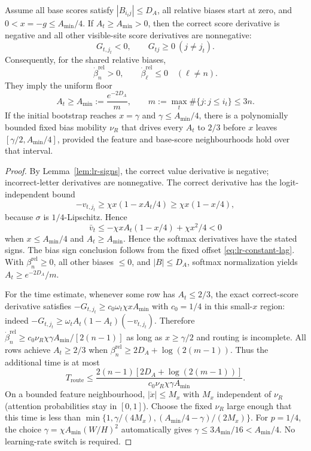 \begin{lrlemma}
\label{lem:lr-bias-learning}
Assume all base scores satisfy $|B_{i_tj}|\le D_A$,
all relative biases start at zero, and
$0<x=-g\le A_{\min}/4$. If $A_t\ge A_{\min}>0$,
then the correct score derivative is negative and all other visible-site
score derivatives are nonnegative:
\begin{equation}\label{eq:lr-smallscore-sign}
 G_{t,j_t}<0,\qquad G_{tj}\ge0\ (j\ne j_t).
\end{equation}
Consequently, for the shared relative biases,
\begin{equation}\label{eq:lr-beta-routes}
 \dot\beta_n^{\mathrm{rel}}>0,\qquad
 \dot\beta_\ell^{\mathrm{rel}}\le0\quad(\ell\ne n).
\end{equation}
They imply the uniform floor
\begin{equation}\label{eq:lr-floor}
 A_t\ge A_{\min}:=\frac{e^{-2D_A}}m,
 \qquad m:=\max_t\#\{j:j\le i_t\}\le3n.
\end{equation}
If the initial bootstrap reaches $x=\gamma$ and
$\gamma\le A_{\min}/4$, there is a polynomially bounded fixed bias
mobility $\nu_R$ that drives every $A_t$ to $2/3$ before $x$ leaves
$[\gamma/2,A_{\min}/4]$, provided the feature and base-score
neighbourhoods hold over that interval.
\end{lrlemma}
\begin{proof}
By Lemma~\ref{lem:lr-signs}, the correct value derivative is negative;
incorrect-letter derivatives are nonnegative.  The correct derivative has the logit-independent bound
\[
 -v_{t,j_t}\ge\chi x(1-xA_t/4)\ge\chi x(1-x/4),
\]
because $\sigma$ is $1/4$-Lipschitz. Hence
\[
 \bar v_t\le-\chi x A_t(1-x/4)+\chi x^2/4<0
\]
when $x\le A_{\min}/4$ and $A_t\ge A_{\min}$.  Hence the softmax derivatives have the stated signs.
The bias sign conclusion follows from the fixed offset
\eqref{eq:lr-constant-lag}.
With $\beta_n^{\mathrm{rel}}\ge0$, all other biases $\le0$,
and $|B|\le D_A$, softmax normalization yields
$A_t\ge e^{-2D_A}/m$.

For the time estimate, whenever some row has $A_t\le2/3$, the exact
correct-score derivative satisfies
$-G_{t,j_t}\ge c_0\omega_t\chi xA_{\min}$
with $c_0=1/4$ in this small-$x$ region: indeed
$-G_{t,j_t}\ge\omega_t A_t(1-A_t)(-v_{t,j_t})$.
Therefore
$\dot\beta_n^{\mathrm{rel}}
\ge c_0\nu_R\chi\gamma A_{\min}/[2(n-1)]$
as long as $x\ge\gamma/2$ and routing is incomplete.
All rows achieve $A_t\ge2/3$ when
$\beta_n^{\mathrm{rel}}\ge
2D_A+\log(2(m-1))$.
Thus the additional time is at most
\[
 T_{\mathrm{route}}
 \le \frac{2(n-1)[2D_A+\log(2(m-1))]}
 {c_0\nu_R\chi\gamma A_{\min}}.
\]
On a bounded feature neighbourhood, $|\dot x|\le M_x$ with $M_x$
independent of $\nu_R$ (attention probabilities stay in $[0,1]$).
Choose the fixed $\nu_R$ large enough that this time is less than
$\min\{1,\gamma/(4M_x),(A_{\min}/4-\gamma)/(2M_x)\}$.
For $p=1/4$, the choice $\gamma=\chi A_{\min}(W/H)^2$
automatically gives $\gamma\le3A_{\min}/16<A_{\min}/4$.
No learning-rate switch is required.
\end{proof}

